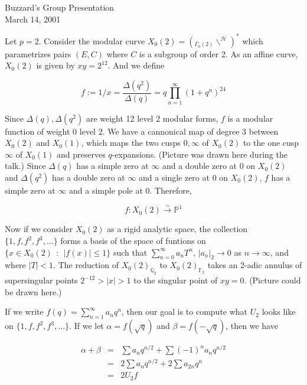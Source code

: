 \documentclass[12pt]{article}
\begin{document}
\begin{center}
\Large Buzzard's Group Presentation \\

\normalsize March 14, 2001

\end{center}

\bigskip


Let $p=2$.  Consider the modular curve $\displaystyle X_{0}(2) = \left(
_{\Gamma_{0}(2)} \backslash ^{\mathcal{H}} \right)^{\ast}$ which
parametrizes pairs $(E,C)$ where $C$ is a subgroup of order 2.  As an affine
curve, $X_{0}(2)$ is given by $xy = 2^{12}$.  And we define

\[f:= 1/x = \frac{\Delta(q^{2})}{\Delta(q)} = q \prod_{n=1}^{\infty}(1+
q^{n})^{24} \]

\noindent Since $\Delta(q), \Delta(q^{2})$ are weight 12 level 2 modular
forms, $f$ is a modular function of weight 0 level 2.  We have a cannonical
map of degree 3 between $X_{0}(2)$ and $X_{0}(1)$, which maps the two cusps
$0, \infty$ of $X_{0}(2)$ to the one cusp $\infty$ of $X_{0}(1)$ and
preserves $q$-expansions.  (Picture was drawn here during the talk.)  Since
$\Delta(q)$ has a simple zero at $\infty$ and a double zero at $0$ on
$X_{0}(2)$ and $\Delta(q^{2})$ has a double zero at $\infty$ and a single
zero at $0$ on $X_{0}(2)$, $f$ has a simple zero at $\infty$ and a simple
pole at $0$.  Therefore,

\[ f: X_{0}(2) \stackrel{\sim}{\longrightarrow} \mathbb{P}^{1} \] 

Now if we consider $X_{0}(2)$ as a rigid analytic space, the collection
$\{1, f, f^{2}, f^{3}, \ldots \}$ forms a basis of the space of funtions on
$\{x \in X_{0}(2) \ \ : \ \ |f(x)| \leq 1 \}$ such that
$\sum_{n=0}^{\infty}a_{n}T^{n}$, $|a_{n}|_{2} \rightarrow 0$ as $n
\rightarrow \infty$, and where $|T| < 1$.  The reduction of
$X_{0}(2)_{\mathbb{Q}_{2}}$ to $X_{0}(2)_{\mathbb{F}_{2}}$ takes an 2-adic
annulus of supersingular points $2^{-12} > |x| > 1$ to the singular point of
$xy = 0$.  (Picture could be drawn here.)

\medskip

If we write $f(q) = \sum_{n=1}^{\infty}a_{n}q^{n}$, then our goal is to
compute what $U_{2}$ looks like on $\{1, f, f^{2}, f^{3}, \ldots \}$.  If we
let $\alpha = f(\sqrt{q})$ and $\beta = f(-\sqrt{q})$, then we have

\begin{eqnarray*}
\alpha + \beta & = & \sum a_{n}q^{n/2} + \sum (-1)^{n}a_{n}q^{n/2} \\
               & = & 2\sum a_{n}q^{n/2} + 2\sum a_{2n}q^{n} \\
               & = & 2U_{2}f
\end{eqnarray*}
\end{document}
